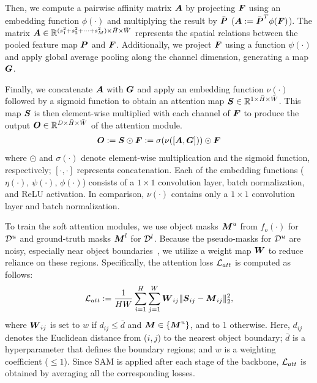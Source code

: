 Then, we compute a pairwise affinity matrix $\boldsymbol{A}$ by projecting $\boldsymbol{F}$ using an embedding function $\phi(\cdot)$ and multiplying the result by $\bar{\boldsymbol{P}}$ (\ie $\boldsymbol{A} := \bar{\boldsymbol{P}}^T \phi(\boldsymbol{F})$). The matrix $\boldsymbol{A} \in \mathbb{R}^{(s_1^2 + s_2^2 + \cdots + s_M^2) \times \bar{H} \times \bar{W}}$ represents the spatial relations between the pooled feature map $\boldsymbol{P}$ and $\boldsymbol{F}$. Additionally, we project $\boldsymbol{F}$ using a function $\psi(\cdot)$ and apply global average pooling along the channel dimension, generating a map $\boldsymbol{G}$.


Finally, we concatenate $\boldsymbol{A}$ with $\boldsymbol{G}$ and apply an embedding function $\nu(\cdot)$ followed by a sigmoid function to obtain an attention map $\boldsymbol{S} \in \mathbb{R}^{1 \times \bar{H} \times \bar{W}}$. This map $\boldsymbol{S}$ is then element-wise multiplied with each channel of $\boldsymbol{F}$ to produce the output $\boldsymbol{O} \in \mathbb{R}^{D \times \bar{H} \times \bar{W}}$ of the attention module.
\begin{equation}
\begin{split}
\boldsymbol{O} := \boldsymbol{S} \odot \boldsymbol{F} := \sigma( \nu ( [\boldsymbol{A}, \boldsymbol{G}] ) ) \odot \boldsymbol{F}
\label{eqn:soft_attention}
\end{split}
\end{equation}
where $\odot$ and $\sigma(\cdot)$ denote element-wise multiplication and the sigmoid function, respectively; $[\cdot, \cdot]$ represents concatenation. Each of the embedding functions ($\eta(\cdot)$, $\psi(\cdot)$, $\phi(\cdot)$) consists of a $1 \times 1$ convolution layer, batch normalization, and ReLU activation. In comparison, $\nu(\cdot)$ contains only a $1 \times 1$ convolution layer and batch normalization.



To train the soft attention modules, we use object masks $\boldsymbol{M}^u$ from $f_o(\cdot)$ for $\mathcal{D}^u$ and ground-truth masks $\boldsymbol{M}^l$ for $\mathcal{D}^l$. Because the pseudo-masks for $\mathcal{D}^u$ are noisy, especially near object boundaries~\cite{wang2022noisy}, we utilize a weight map $\boldsymbol{W}$ to reduce reliance on these regions. Specifically, the attention loss $\mathcal{L}_{att}$ is computed as follows:
\begin{equation}
\begin{split}
& \mathcal{L}_{att} := \frac{1}{HW} \sum_{i=1}^H \sum_{j=1}^W \boldsymbol{W}_{ij} \lVert\boldsymbol{S}_{ij}-\boldsymbol{M}_{ij}\rVert^2_2, \\
\end{split}
\end{equation}
where $\boldsymbol{W}_{ij}$ is set to $w$ if $d_{ij} \leq \bar{d}$ and $\boldsymbol{M} \in \{\boldsymbol{M}^u\}$, and to 1 otherwise. Here, $d_{ij}$ denotes the Euclidean distance from ($i, j$) to the nearest object boundary; $\bar{d}$ is a hyperparameter that defines the boundary regions; and $w$ is a weighting coefficient ($\leq 1$). Since SAM is applied after each stage of the backbone, $\mathcal{L}_{att}$ is obtained by averaging all the corresponding losses.

